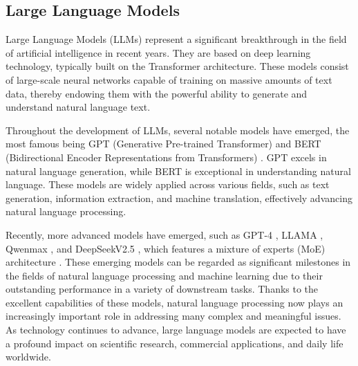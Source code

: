 \subsection{Large Language Models}
Large Language Models (LLMs) represent a significant breakthrough in the field of artificial intelligence in recent years. They are based on deep learning technology, typically built on the Transformer architecture. These models consist of large-scale neural networks capable of training on massive amounts of text data, thereby endowing them with the powerful ability to generate and understand natural language text.

Throughout the development of LLMs, several notable models have emerged, the most famous being GPT (Generative Pre-trained Transformer) \cite{gpt} and BERT (Bidirectional Encoder Representations from Transformers) \cite{bert}. GPT excels in natural language generation, while BERT is exceptional in understanding natural language. These models are widely applied across various fields, such as text generation, information extraction, and machine translation, effectively advancing natural language processing.

Recently, more advanced models have emerged, such as GPT-4 \cite{openai2024gpt4}, LLAMA \cite{llama3}, Qwenmax \cite{bai2023qwen}, and DeepSeekV2.5 \cite{liu2024deepseek}, which features a mixture of experts (MoE) architecture . These emerging models can be regarded as significant milestones in the fields of natural language processing and machine learning due to their outstanding performance in a variety of downstream tasks. Thanks to the excellent capabilities of these models, natural language processing now plays an increasingly important role in addressing many complex and meaningful issues. As technology continues to advance, large language models are expected to have a profound impact on scientific research, commercial applications, and daily life worldwide.

